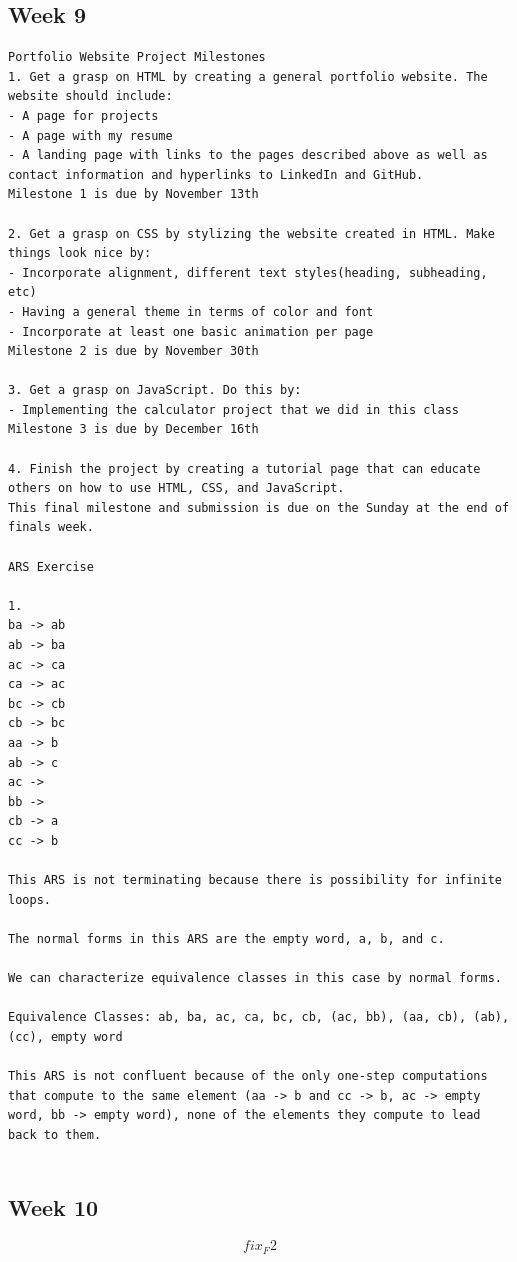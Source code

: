 \documentclass{article}
\theoremstyle{theorem}
\theoremstyle{definition}
\theoremstyle{remark}
\begin{document}
\subsection{Week 9}
\begin{verbatim}
Portfolio Website Project Milestones
1. Get a grasp on HTML by creating a general portfolio website. The website should include: 
- A page for projects
- A page with my resume
- A landing page with links to the pages described above as well as contact information and hyperlinks to LinkedIn and GitHub.
Milestone 1 is due by November 13th

2. Get a grasp on CSS by stylizing the website created in HTML. Make things look nice by:
- Incorporate alignment, different text styles(heading, subheading, etc)
- Having a general theme in terms of color and font
- Incorporate at least one basic animation per page
Milestone 2 is due by November 30th

3. Get a grasp on JavaScript. Do this by: 
- Implementing the calculator project that we did in this class
Milestone 3 is due by December 16th

4. Finish the project by creating a tutorial page that can educate others on how to use HTML, CSS, and JavaScript.
This final milestone and submission is due on the Sunday at the end of finals week.

ARS Exercise

1.
ba -> ab
ab -> ba
ac -> ca
ca -> ac
bc -> cb
cb -> bc
aa -> b
ab -> c
ac ->  
bb ->
cb -> a
cc -> b

This ARS is not terminating because there is possibility for infinite loops.

The normal forms in this ARS are the empty word, a, b, and c.

We can characterize equivalence classes in this case by normal forms. 

Equivalence Classes: ab, ba, ac, ca, bc, cb, (ac, bb), (aa, cb), (ab), (cc), empty word

This ARS is not confluent because of the only one-step computations that compute to the same element (aa -> b and cc -> b, ac -> empty word, bb -> empty word), none of the elements they compute to lead back to them.


\end{verbatim}

\subsection{Week 10}
\[fix_F2\]
\end{document}
